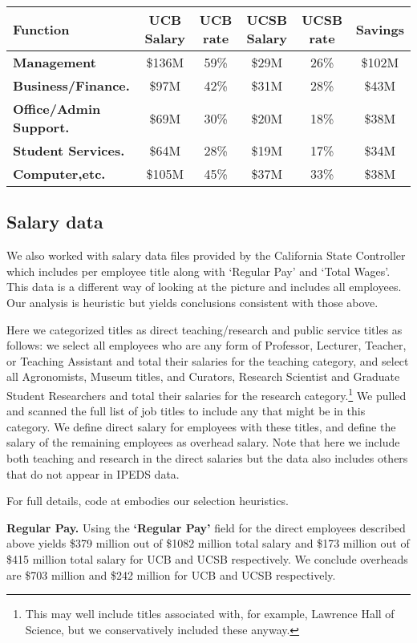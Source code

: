 \documentclass[11pt]{article}
\begin{document}
\begin{tabular}{|l | c | c | c | c| c|}
\hline
Function & UCB Salary & UCB rate & UCSB Salary & UCSB rate & Savings \\
\hline
{\bf Management} & \$136M & 59\% & \$29M & 26\% & \$102M \\
{\bf Business/Finance.} & \$97M  & 42\% & \$31M  &28\% & \$43M  \\
{\bf Office/Admin Support.} & \$69M & 30\% &
\$20M & 18\% & \$38M \\
{\bf Student Services.} & \$64M  & 28\% & \$19M  &
 17\% & \$34M\\
{\bf Computer,etc.} & \$105M  & 45\% & \$37M  & 33\%&  \$38M \\
\hline
\end{tabular}


\subsection{Salary data}

We also worked with salary data files provided by the California State
Controller which includes per employee title along with `Regular Pay'
and `Total Wages'\cite{salary}.  This data is a different way of
looking at the picture and includes all employees.  Our analysis is
heuristic but yields conclusions consistent with those above.

Here we categorized titles as direct teaching/research and public
service titles as follows: we select all employees who are any form of
Professor, Lecturer, Teacher, or Teaching Assistant and total their
salaries for the teaching category, and select all Agronomists, Museum
titles, and Curators, Research Scientist and Graduate Student
Researchers and total their salaries for the research
category.\footnote{This may well include titles associated with, for
  example, Lawrence Hall of Science, but we conservatively included
  these anyway.} We pulled and scanned the full list of job titles to
include any that might be in this category. We define direct salary
for employees with these titles, and define the salary of the
remaining employees as overhead salary. Note that here we include
both teaching and research in the direct salaries but the data
also includes others that do not appear in IPEDS data.

For full details,  code at \cite{github-link} embodies our selection heuristics. 

{\bf Regular Pay.}  Using the {\bf `Regular Pay'} field for the direct
employees described above yields \$379 million out of \$1082 million
total salary and \$173 million out of \$415 million total salary for
UCB and UCSB respectively. We conclude overheads are \$703 million
and \$242 million for UCB and UCSB respectively.
\end{document}
